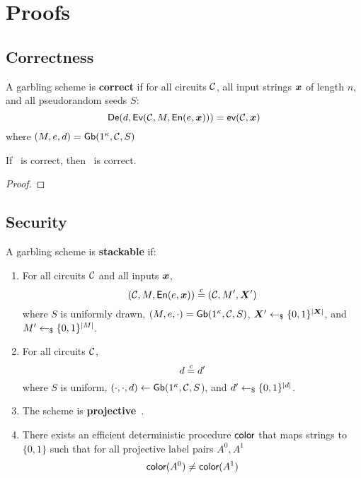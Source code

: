 \section{Proofs}\label{sec:proof}

\subsection{Correctness}\label{sec:correctness}

\begin{definition}[Correctness]\label{def:correct}
  A garbling scheme is \textbf{correct} if for
  all circuits $\mathcal C$,
  all input strings $\cirinp$ of length $n$,
  and all pseudorandom seeds $S$:
  \[
    \gDe(d, \gEv(\cir, \mat,\gEn(e,\cirinp))) = \gev(\cir,\cirinp)
  \]
  where $(M, e, d) = \textsf{Gb}(1^\kappa,\mathcal C,S)$
\end{definition}

\begin{theorem}\label{theorem:correctness}
  If \underscheme\ is correct, then \ourscheme\ is correct.
\end{theorem}
\begin{proof}
\end{proof}

\subsection{Security}

\begin{definition}[Stackability]\label{def:stackable}
  A garbling scheme is \textbf{stackable} if:
  \begin{enumerate}
    \item
      For
      all circuits $\mathcal C$
      and all inputs $\cirinp$,
      \[
        (\cir, \mat, \gEn(e, \cirinp)) \indist (\cir, \mat', \gcirinp')
      \]
      where
      $S$ is uniformly drawn,
      $(M, e, \cdot) = \textsf{Gb}(1^\kappa, \mathcal C, S)$,
      $\gcirinp' \drawnfrom{} \{0, 1\}^{|\gcirinp|}$,
      and $M' \gets_{\$} \{0, 1\}^{|M|}$.
    \item
      For all circuits $\mathcal C$,
      \[
        d \overset{c}{=} d'
      \]
      where
      $S$ is uniform, $(\cdot, \cdot, d) \gets \textsf{Gb}(1^\kappa, \mathcal C,
      S$),
      and $d' \gets_{\$} \{0, 1\}^{|d|}$.
    \item
      The scheme is \textbf{projective}~\cite{CCS:BelHoaRog12}.
    \item
      There exists an efficient deterministic procedure $\textsf{color}$ that maps strings to $\{0, 1\}$ such that for all projective label pairs $A^0, A^1$
      \[
        \textsf{color}(A^0) \neq \textsf{color}(A^1)
      \]
  \end{enumerate}
\end{definition}

